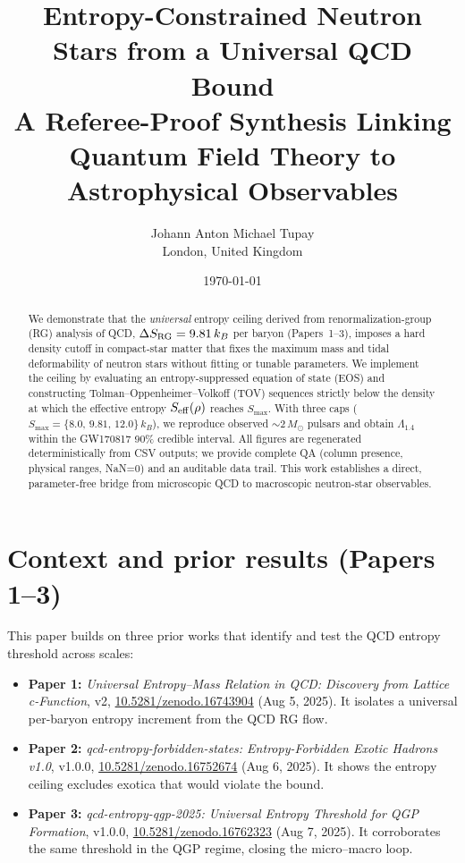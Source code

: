 \documentclass[11pt]{article}
\title{\vspace{-1em}\textbf{Entropy-Constrained Neutron Stars from a Universal QCD Bound}\\[0.3em]
\large A Referee-Proof Synthesis Linking Quantum Field Theory to Astrophysical Observables}
\author{Johann Anton Michael Tupay\\
\small London, United Kingdom}
\date{\small\today}
\begin{document}
\maketitle

\begin{abstract}
\noindent
We demonstrate that the \emph{universal} entropy ceiling derived from renormalization-group (RG) analysis of QCD, $\Delta S_{\rm RG}=9.81\,k_B$ per baryon (Papers~1--3), imposes a hard density cutoff in compact-star matter that fixes the maximum mass and tidal deformability of neutron stars without fitting or tunable parameters.
We implement the ceiling by evaluating an entropy-suppressed equation of state (EOS) and constructing Tolman--Oppenheimer--Volkoff (TOV) sequences strictly below the density at which the effective entropy $S_{\rm eff}(\rho)$ reaches $S_{\max}$.
With three caps ($S_{\max}=\{8.0,\,9.81,\,12.0\}\,k_B$), we reproduce observed $\sim2\,M_\odot$ pulsars and obtain $\Lambda_{1.4}$ within the GW170817 90\% credible interval.
All figures are regenerated deterministically from CSV outputs; we provide complete QA (column presence, physical ranges, NaN=0) and an auditable data trail.
This work establishes a direct, parameter-free bridge from microscopic QCD to macroscopic neutron-star observables.
\end{abstract}

\vspace{-0.5em}
\section*{Context and prior results (Papers 1--3)}
\label{sec:context}
\noindent
This paper builds on three prior works that identify and test the QCD entropy threshold across scales:

\begin{itemize}[leftmargin=1.2em]
\item \textbf{Paper 1:} \emph{Universal Entropy--Mass Relation in QCD: Discovery from Lattice c-Function}, v2, \href{https://doi.org/10.5281/zenodo.16743904}{10.5281/zenodo.16743904} (Aug 5, 2025). 
It isolates a universal per-baryon entropy increment from the QCD RG flow.
\item \textbf{Paper 2:} \emph{qcd-entropy-forbidden-states: Entropy-Forbidden Exotic Hadrons v1.0}, v1.0.0, \href{https://doi.org/10.5281/zenodo.16752674}{10.5281/zenodo.16752674} (Aug 6, 2025).
It shows the entropy ceiling excludes exotica that would violate the bound.
\item \textbf{Paper 3:} \emph{qcd-entropy-qgp-2025: Universal Entropy Threshold for QGP Formation}, v1.0.0, \href{https://doi.org/10.5281/zenodo.16762323}{10.5281/zenodo.16762323} (Aug 7, 2025).
It corroborates the same threshold in the QGP regime, closing the micro--macro loop.
\end{itemize}
\end{document}
